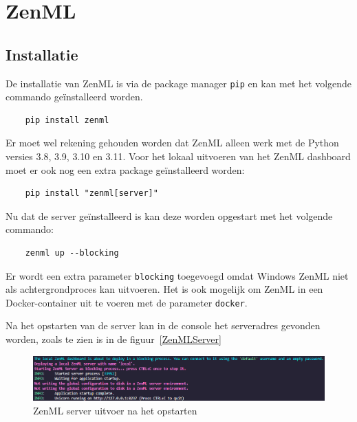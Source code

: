 \section{ZenML}
\subsection{Installatie}
De installatie van ZenML is via de package manager \texttt{pip} en kan met het volgende commando geïnstalleerd worden.
\begin{verbatim}
    pip install zenml
\end{verbatim}
Er moet wel rekening gehouden worden dat ZenML alleen werk met de Python versies 3.8, 3.9, 3.10 en 3.11.
Voor het lokaal uitvoeren van het ZenML dashboard moet er ook nog een extra package geïnstalleerd worden:
\begin{verbatim}
    pip install "zenml[server]"
\end{verbatim}

Nu dat de server geïnstalleerd is kan deze worden opgestart met het volgende commando: 
\begin{verbatim}
    zenml up --blocking
\end{verbatim}
Er wordt een extra parameter \texttt{blocking} toegevoegd omdat Windows ZenML niet als achtergrondproces kan uitvoeren. Het is ook mogelijk om ZenML in een Docker-container uit te voeren met de parameter \texttt{docker}.

Na het opstarten van de server kan in de console het serveradres gevonden worden, zoals te zien is in de figuur~\ref{ZenMLServer}
\begin{figure}
    \centering
    \includegraphics[width=0.9\linewidth]{graphics/ZenML_Server.PNG}
    \caption{ZenML server uitvoer na het opstarten}
    \label{fig:ZenMLServer}
\end{figure}
